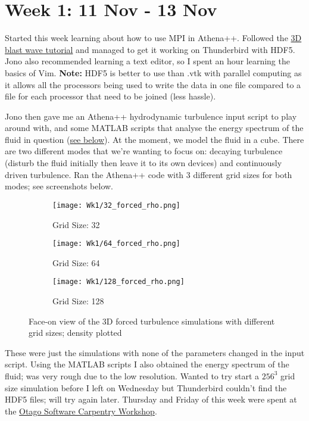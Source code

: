 \documentclass[12pt,letterpaper]{article}
\begin{document}
\section*{Week 1: 11 Nov - 13 Nov}

Started this week learning about how to use MPI in Athena++. Followed the \href{https://github.com/PrincetonUniversity/athena-public-version/wiki/Running-3D-MHD-with-OpenMP-and-MPI}{3D blast wave tutorial} and managed to get it working on Thunderbird with HDF5. Jono also recommended learning a text editor, so I spent an hour learning the basics of Vim. \textbf{Note:} HDF5 is better to use than .vtk with parallel computing as it allows all the processors being used to write the data in one file compared to a file for each processor that need to be joined (less hassle).

Jono then gave me an Athena++ hydrodynamic turbulence input script to play around with, and some MATLAB scripts that analyse the energy spectrum of the fluid in question (\hyperlink{Kolmogorov}{see below}). At the moment, we model the fluid in a cube. There are two different modes that we're wanting to focus on: decaying turbulence (disturb the fluid initially then leave it to its own devices) and continuously driven turbulence. Ran the Athena++ code with 3 different grid sizes for both modes; see screenshots below.

\begin{figure}[!h]
 \centering
\begin{subfigure}{0.3\textwidth}
\texttt{[image: Wk1/32\_forced\_rho.png]} 
\caption{Grid Size: 32}
\label{fig:32rho}
\end{subfigure}
\begin{subfigure}{0.3\textwidth}
\texttt{[image: Wk1/64\_forced\_rho.png]}
\caption{Grid Size: 64}
\label{fig:64rho}
\end{subfigure}
\begin{subfigure}{0.3\textwidth}
\texttt{[image: Wk1/128\_forced\_rho.png]}
\caption{Grid Size: 128}
\label{fig:128rho}
\end{subfigure}
 
\caption{Face-on view of the 3D forced turbulence simulations with different grid sizes; density plotted}
\label{fig:forcedturb}
\end{figure}

These were just the simulations with none of the parameters changed in the input script. Using the MATLAB scripts I also obtained the energy spectrum of the fluid; was very rough due to the low resolution. Wanted to try start a $256^3$ grid size simulation before I left on Wednesday but Thunderbird couldn't find the HDF5 files; will try again later. Thursday and Friday of this week were spent at the \href{https://otagocarpentries.github.io/2019-11-14-otago/}{Otago Software Carpentry Workshop}.
\end{document}
